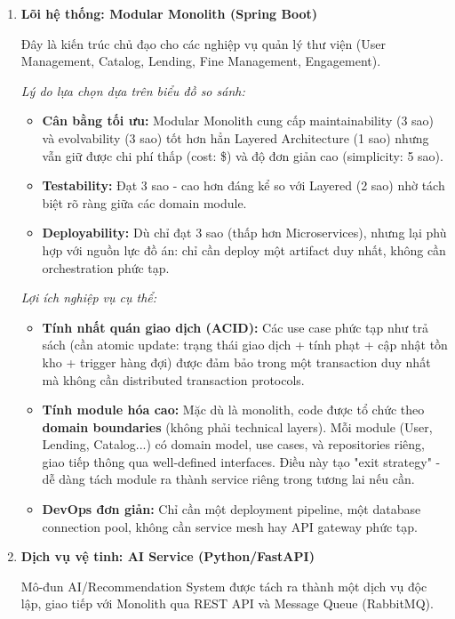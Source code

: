 \begin{enumerate}
    \item \textbf{Lõi hệ thống: Modular Monolith (Spring Boot)}
    
    Đây là kiến trúc chủ đạo cho các nghiệp vụ quản lý thư viện (User Management, Catalog, Lending, Fine Management, Engagement).
    
    \textit{Lý do lựa chọn dựa trên biểu đồ so sánh:}
    \begin{itemize}
        \item \textbf{Cân bằng tối ưu:} Modular Monolith cung cấp maintainability (3 sao) và evolvability (3 sao) tốt hơn hẳn Layered Architecture (1 sao) nhưng vẫn giữ được chi phí thấp (cost: \$) và độ đơn giản cao (simplicity: 5 sao).
        \item \textbf{Testability:} Đạt 3 sao - cao hơn đáng kể so với Layered (2 sao) nhờ tách biệt rõ ràng giữa các domain module.
        \item \textbf{Deployability:} Dù chỉ đạt 3 sao (thấp hơn Microservices), nhưng lại phù hợp với nguồn lực đồ án: chỉ cần deploy một artifact duy nhất, không cần orchestration phức tạp.
    \end{itemize}
    
    \textit{Lợi ích nghiệp vụ cụ thể:}
    \begin{itemize}
        \item \textbf{Tính nhất quán giao dịch (ACID):} Các use case phức tạp như trả sách (cần atomic update: trạng thái giao dịch + tính phạt + cập nhật tồn kho + trigger hàng đợi) được đảm bảo trong một transaction duy nhất mà không cần distributed transaction protocols.
        \item \textbf{Tính module hóa cao:} Mặc dù là monolith, code được tổ chức theo \textbf{domain boundaries} (không phải technical layers). Mỗi module (User, Lending, Catalog...) có domain model, use cases, và repositories riêng, giao tiếp thông qua well-defined interfaces. Điều này tạo "exit strategy" - dễ dàng tách module ra thành service riêng trong tương lai nếu cần.
        \item \textbf{DevOps đơn giản:} Chỉ cần một deployment pipeline, một database connection pool, không cần service mesh hay API gateway phức tạp.
    \end{itemize}

    \item \textbf{Dịch vụ vệ tinh: AI Service (Python/FastAPI)}
    
    Mô-đun AI/Recommendation System được tách ra thành một dịch vụ độc lập, giao tiếp với Monolith qua REST API và Message Queue (RabbitMQ).
    

\end{enumerate}
